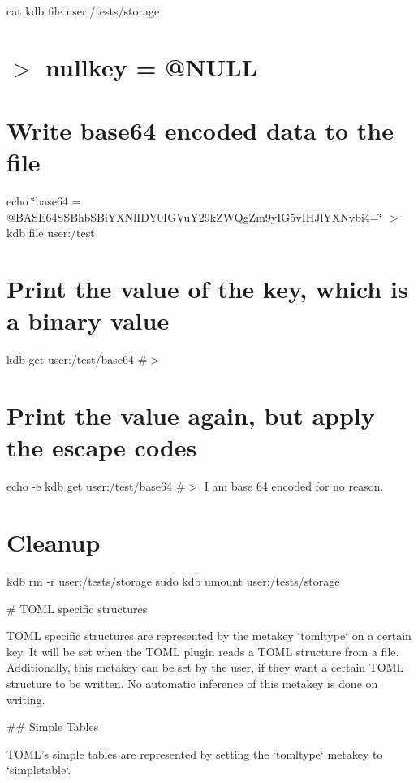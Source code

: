 cat {\ttfamily kdb file user\+:/tests/storage} \hypertarget{autotoc_md635_autotoc_md694}{}\section{$>$ nullkey = \textquotesingle{}@\+N\+U\+L\+L\textquotesingle{}}\label{autotoc_md635_autotoc_md694}
\hypertarget{autotoc_md635_autotoc_md695}{}\section{Write base64 encoded data to the file}\label{autotoc_md635_autotoc_md695}
echo \char`\"{}base64 = \textquotesingle{}@\+B\+A\+S\+E64\+S\+S\+Bhb\+S\+Bi\+Y\+X\+Nl\+I\+D\+Y0\+I\+G\+Vu\+Y29k\+Z\+W\+Qg\+Zm9y\+I\+G5v\+I\+H\+Jl\+Y\+X\+Nvbi4=\textquotesingle{}\char`\"{} $>$ {\ttfamily kdb file user\+:/test}\hypertarget{autotoc_md635_autotoc_md696}{}\section{Print the value of the key, which is a binary value}\label{autotoc_md635_autotoc_md696}
kdb get \textquotesingle{}user\+:/test/base64\textquotesingle{} \#$>$ \hypertarget{autotoc_md635_autotoc_md697}{}\section{Print the value again, but apply the escape codes}\label{autotoc_md635_autotoc_md697}
echo -\/e {\ttfamily kdb get \textquotesingle{}user\+:/test/base64\textquotesingle{}} \#$>$ I am base 64 encoded for no reason.\hypertarget{autotoc_md635_autotoc_md698}{}\section{Cleanup}\label{autotoc_md635_autotoc_md698}
kdb rm -\/r user\+:/tests/storage sudo kdb umount user\+:/tests/storage 
\begin{DoxyCode}
# TOML specific structures

TOML specific structures are represented by the metakey `tomltype` on a certain key.
It will be set when the TOML plugin reads a TOML structure from a file. Additionally, this metakey can be
       set by the user, if they want a certain TOML structure to be written.
No automatic inference of this metakey is done on writing.

## Simple Tables

TOML's simple tables are represented by setting the `tomltype` metakey to `simpletable`.
\end{DoxyCode}
